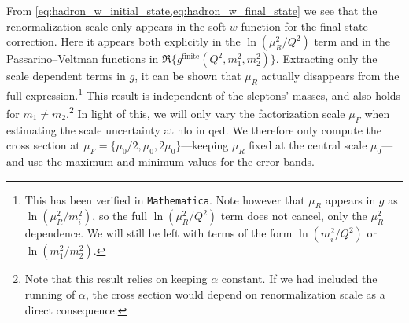 From \cref{eq:hadron_w_initial_state,eq:hadron_w_final_state} we see that the renormalization scale only appears in the soft $w$-function for the final-state correction.
Here it appears both explicitly in the $\ln(\mu_R^2/Q^2)$ term and in the Passarino--Veltman functions in $\Re\{g^{\text{finite}}(Q^2,m_1^2,m_2^2)\}$.
Extracting only the scale dependent terms in $g$, it can be shown that $\mu_R$ actually disappears from the full expression.\footnote{This has been verified in \texttt{Mathematica}. Note however that $\mu_R$ appears in $g$ as $\ln(\mu_R^2/m_i^2)$, so the full $\ln(\mu_R^2/Q^2)$ term does not cancel, only the $\mu_R^2$ dependence. We will still be left with terms of the form $\ln(m_i^2/Q^2)$ or $\ln(m_1^2/m_2^2)$.}
This result is independent of the sleptons' masses, and also holds for $m_1\neq m_2$.\footnote{Note that this result relies on keeping $\alpha$ constant. If we had included the running of $\alpha$, the cross section would depend on renormalization scale as a direct consequence.}
In light of this, we will only vary the factorization scale $\mu_F$ when estimating the scale uncertainty at \gls{nlo} in \gls{qed}.
We therefore only compute the cross section at $\mu_F=\{\mu_0/2, \mu_0, 2\mu_0\}$---keeping $\mu_R$ fixed at the central scale $\mu_0$---and use the maximum and minimum values for the error bands.





